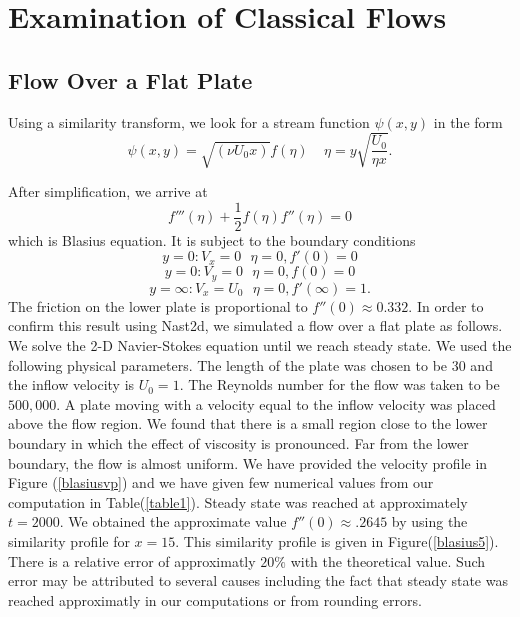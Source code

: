 

%

\chapter{Examination of Classical Flows}

\section{Flow Over a Flat Plate}

Using a similarity transform, we look for a stream function $\psi(x,y)$ in the form 
$$\psi(x,y) = \sqrt{(\nu U_0 x)}f(\eta)\ \ \ \ \ \eta = y \sqrt{\frac{U_0}{\eta x}}.$$

After simplification, we arrive at $$f'''(\eta) + \frac{1}{2}f(\eta)f''(\eta) = 0$$
which is Blasius equation. It is subject to the boundary conditions 
$$ y=0: V_x = 0 \ \ \  \eta = 0, f'(0) = 0$$
$$ y=0: V_y = 0 \ \ \  \eta = 0, f(0) = 0$$
$$ y=\infty: V_x = U_0 \ \ \  \eta = 0, f'(\infty) = 1.$$
The friction on the lower plate is proportional to $f''(0) \approx 0.332$. In order to confirm this result using Nast2d, we simulated a flow over a flat plate as follows.  
We solve the 2-D Navier-Stokes equation until we reach steady state. We used the following physical parameters. The length of the plate was chosen to be $30$ and the inflow velocity is $U_0 = 1$. The Reynolds number for the flow was taken to be $500,000$. A plate moving with a velocity equal to the inflow velocity was placed above the flow region. We found that there is a small region close to the lower boundary in which the effect of viscosity is pronounced. Far from the lower boundary, the flow is almost uniform. We have provided the velocity profile in Figure (\ref{blasiusvp}) and we have given few numerical values from our computation in Table(\ref{table1}). Steady state was reached at approximately $t = 2000$. We obtained the approximate value $f''(0) \approx .2645$ by using the similarity profile for $x = 15$. This similarity profile is given in Figure(\ref{blasius5}). There is a relative error of approximatly $20\%$ with the theoretical value. Such error may be attributed to several causes including the fact that steady state was reached approximatly in our computations or from rounding errors.  

